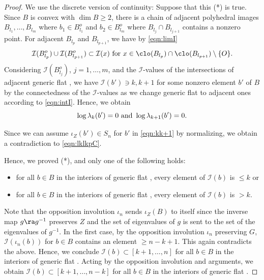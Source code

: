 \begin{proof}
We use the discrete version of continuity: 
	Suppose that this (*) is true. 
	Since $B$ is convex with $\dim B \geq 2$, 
	there is a chain of adjacent polyhedral images 
	$B_{l_1}, \dots, B_{l_m}$ where $b_1 \in B_{l_1}^o$
	and $b_2 \in B_{l_m}^o$
	where $B_{l_j}\cap B_{l_{j+1}}$ contains a nonzero point.  
	For adjacent $B_{l_p}$ and $B_{l_{p+1}}$, 
	we have by \eqref{eqn:limI} 
\begin{equation} \label{eqn:intI} 
 \mathcal{I}(B_{l_p}^o)\cup \mathcal{I}(B_{l_{p+1}}^o) \subset \mathcal{I}(x)  \text{ for }
x\in \clo(B_{l_p})\cap \clo(B_{l_{p+1}}) \setminus \{O\}. 
\end{equation} 
	Considering $\mathcal{I}(B_{l_j}^o)$, $j=1, \dots, m$, and 
	the $\mathcal{I}$-values of the intersections of adjacent generic flat , we have 
$\mathcal{I}(b') \ni k, k+1$ for some nonzero element $b'$ of $B$ by 
the connectedness of the $\mathcal{I}$-values as we change
generic flat  to adjacent ones according to 
\eqref{eqn:intI}.
Hence, we obtain
\begin{equation}\label{eqn:kk+1}  
\log \lambda_k(b') = 0 
\hbox{ and }\log \lambda_{k+1}(b')=0.
\end{equation}  





	Since we can assume $\iota_Z(b') \in S_n$ for $b'$ in \eqref{eqn:kk+1}
	by normalizing, we obtain a contradiction to \eqref{eqn:lklkpC}. 
	

	
	Hence, we proved (*), and  
only one of the following holds:
	\begin{itemize} 
	\item for all $b\in B$ in the interiors of generic flat ,  every element of $\mathcal{I}(b)$ is $\leq k$ 
	or 
	\item for all $b \in B$ in the interiors of generic flat , every element of 
	$\mathcal{I}(b)$ is $> k$.
	\end{itemize} 

Note that the opposition involution $\iota_n$ sends $\iota_Z(B)$ to itself
since the inverse map $g\ra g^{-1}$ preserves $Z$ 
and the set of eigenvalues of $g$ is sent to the set of 
the eigenvalues of $g^{-1}$.
	In the first case, by the opposition involution $\iota_n$ preserving $G$, 
	$\mathcal{I}(\iota_n(b))$ for $b \in B$ contains an element $\geq n-k+1$.
	This again contradicts the above. 
	Hence, we conclude $\mathcal{I}(b) \subset [k+1, \dots, n]$ for all $b \in B$
	in the interiors of generic flat . 
Acting by the opposition involution and  arguments, we obtain 
$\mathcal{I}(b)\subset [k+1, \dots, n-k]$ for all $b \in B$ in the interiors of generic flat 
. 


\end{proof}
